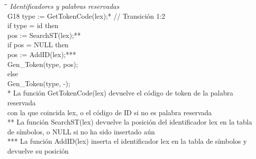 \begin{tabbing}
    \hspace{1cm}\=\hspace{1cm}\=\hspace{7cm}\=\kill
    \textit{Identificadores y palabras reservadas} \\
    \> G18 \> type := GetTokenCode(lex);*\> // Transición 1:2\\
    \> \hspace{1cm}if type = id then\\
    \> \hspace{2cm}pos := SearchST(lex);**\\
    \> \hspace{2cm}if pos = NULL then\\
    \> \hspace{3cm}pos := AddID(lex);***\\
    \> \hspace{2cm}Gen\_Token(type, pos);\\
    \> \hspace{1cm}else\\
    \> \hspace{2cm}Gen\_Token(type, -);\\
    \>* La función GetTokenCode(lex) devuelve el código de token de la palabra reservada \\
    \>con la que coincida lex, o el código de ID si no es palabra reservada\\
    \>** La función SearchST(lex) devuelve la posición del identificador lex en la tabla \\
    \>de símbolos, o NULL si no ha sido insertado aún\\
    \>*** La función AddID(lex) inserta el identificador lex en la tabla de símbolos y \\
    \>devuelve su posición\\
\end{tabbing}